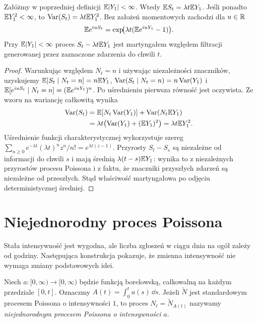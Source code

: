 \begin{twierdzenie}
Załóżmy w poprzedniej definicji $\mathbb{E}|Y_1|<\infty$.
Wtedy $\mathbb{E} S_t=\lambda t\mathbb{E} Y_1$.
Jeśli ponadto $\mathbb{E} Y_1^2<\infty$, to
$\operatorname{Var}(S_t)=\lambda t\mathbb{E} Y_1^2$.
Bez założeń momentowych zachodzi dla $u\in\mathbb{R}$
\[
\mathbb{E} e^{iuS_t}=\exp\!\bigl(\lambda t(\mathbb{E} e^{iuY_1}-1)\bigr).
\]
Przy $\mathbb{E}|Y_1|<\infty$ proces
$S_t-\lambda t\mathbb{E} Y_1$ jest martyngałem względem
filtracji generowanej przez zaznaczone zdarzenia do chwili $t$.
\end{twierdzenie}
\begin{proof}
Warunkując względem $N_t=n$ i używając niezależności znaczników,
uzyskujemy $\mathbb{E}[S_t\mid N_t=n]=n\mathbb{E} Y_1$,
$\operatorname{Var}(S_t\mid N_t=n)=n\operatorname{Var}(Y_1)$ i
$\mathbb{E}[e^{iuS_t}\mid N_t=n]=(\mathbb{E} e^{iuY_1})^n$.
Po uśrednieniu pierwsza równość jest oczywista. Ze wzoru
na wariancję całkowitą wynika
\begin{align*}
\operatorname{Var}(S_t)&=\mathbb{E}[N_t\operatorname{Var}(Y_1)]
 +\operatorname{Var}(N_t\mathbb{E} Y_1)\\
&=\lambda t\bigl(\operatorname{Var}(Y_1)+(\mathbb{E} Y_1)^2\bigr)
=\lambda t\mathbb{E} Y_1^2.
\end{align*}
Uśrednienie funkcji charakterystycznej wykorzystuje szereg
$\sum_{n\ge0}e^{-\lambda t}(\lambda t)^n z^n/n!
=e^{\lambda t(z-1)}$.
Przyrosty $S_t-S_s$ są niezależne od informacji do chwili $s$
i mają średnią $\lambda(t-s)\mathbb{E} Y_1$:
wynika to z niezależnych przyrostów procesu Poissona i z faktu,
że znaczniki przyszłych zdarzeń są niezależne od przeszłych.
Stąd właściwość martyngałowa po odjęciu deterministycznej średniej.
\end{proof}

\section{Niejednorodny proces Poissona}
Stała intensywność jest wygodna, ale liczba zgłoszeń w ciągu
dnia na ogół zależy od godziny. Następująca konstrukcja pokazuje,
że zmienna intensywność nie wymaga zmiany podstawowych idei.

\begin{definicja}
Niech $a:[0,\infty)\to[0,\infty)$ będzie funkcją borelowską,
całkowalną na każdym przedziale $[0,t]$. Oznaczmy
$A(t)=\int_0^t a(s)\,\dd s$.
Jeżeli $\widetilde N$ jest standardowym procesem Poissona
o intensywności $1$, to proces $N_t=\widetilde N_{A(t)}$
nazywamy \emph{niejednorodnym procesem Poissona o intensywności $a$}.
\end{definicja}

